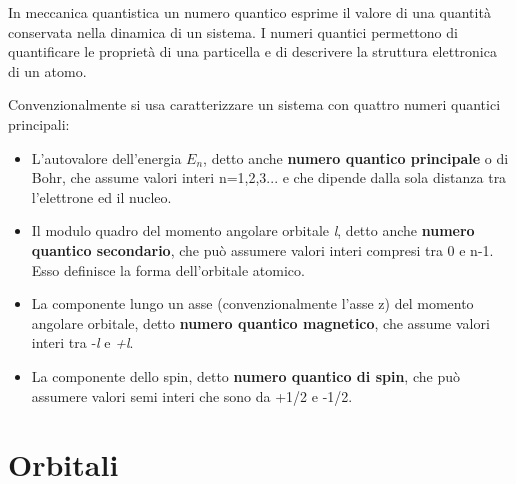 \documentclass[10pt,a4paper]{article}
\begin{document}
In meccanica quantistica un numero quantico esprime il valore di una quantità conservata nella dinamica di un sistema. I numeri quantici permettono di quantificare le proprietà di una particella e di descrivere la struttura elettronica di un atomo.

Convenzionalmente si usa caratterizzare un sistema con quattro numeri quantici principali:

\begin{itemize}


\item L'autovalore dell'energia $E_{n}$, detto anche \textbf{numero quantico principale} o di Bohr, che assume valori interi n=1,2,3... e che dipende dalla sola distanza tra l'elettrone ed il nucleo.

\item Il modulo quadro del momento angolare orbitale \textit{l}, detto anche \textbf{numero quantico secondario}, che può assumere valori interi compresi tra 0 e n-1. Esso definisce la forma dell'orbitale atomico.

\item La componente lungo un asse (convenzionalmente l'asse z) del momento angolare orbitale, detto \textbf{numero quantico magnetico}, che assume valori interi tra -\textit{l} e \textit{+l}.

\item La componente dello spin, detto \textbf{numero quantico di spin}, che può assumere valori semi interi che sono da +1/2 e -1/2.	
\end{itemize}

\section{Orbitali}
	
\end{document}
